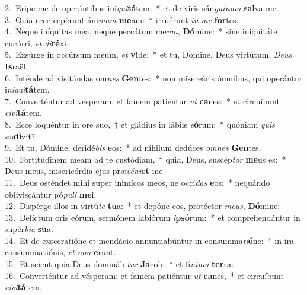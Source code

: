 {2.~}Eripe me de operántibus ini\textit{qui}\textbf{tá}tem:~* et de viris sán\textit{gui}\textit{num} \textbf{sal}va me.\\
{3.~}Quia ecce cepérunt áni\textit{mam} \textbf{me}am:~* irruérunt \textit{in} \textit{me} \textbf{for}tes.\\
{4.~}Neque iníquitas mea, neque peccátum me\textit{um}, \textbf{Dó}mine:~* sine iniquitáte cucúrri, \textit{et} \textit{di}\textbf{ré}xi.\\
{5.~}Exsúrge in occúrsum meum, \textit{et} \textbf{vi}de:~* et tu, Dómine, Deus virtútum, \textit{De}\textit{us} \textbf{Is}raël.\\
{6.~}Inténde ad visitándas om\textit{nes} \textbf{Gen}tes:~* non misereáris ómnibus, qui operántur i\textit{ni}\textit{qui}\textbf{tá}tem.\\
{7.~}Converténtur ad vésperam: et famem patiéntur \textit{ut} \textbf{ca}nes:~* et circuíbunt \textit{ci}\textit{vi}\textbf{tá}tem.\\
{8.~}Ecce loquéntur in ore suo,~† et gládius in lábiis \textit{e}\textbf{ó}rum:~* quóniam \textit{quis} \textit{au}\textbf{dí}vit?\\
{9.~}Et tu, Dómine, deridé\textit{bis} \textbf{e}os:~* ad níhilum dedúces \textit{om}\textit{nes} \textbf{Gen}tes.\\
{10.~}Fortitúdinem meam ad te custódiam,~† quia, Deus, suscép\textit{tor} \textbf{me}us es:~* Deus meus, misericórdia ejus præ\textit{vé}\textit{ni}\textbf{et} me.\\
{11.~}Deus osténdet mihi super inimícos meos, ne occí\textit{das} \textbf{e}os:~* nequándo obliviscántur pó\textit{pu}\textit{li} \textbf{me}i.\\
{12.~}Dispérge illos in virtú\textit{te} \textbf{tu}a:~* et depóne eos, protéctor \textit{me}\textit{us}, \textbf{Dó}mine:\\
{13.~}Delíctum oris eórum, sermónem labiórum \textit{i}\textbf{psó}rum:~* et comprehendántur in supér\textit{bi}\textit{a} \textbf{su}a.\\
{14.~}Et de exsecratióne et mendácio annuntiabúntur in consumma\textit{ti}\textbf{ó}ne:~* in ira consummatiónis, \textit{et} \textit{non} \textbf{e}runt.\\
{15.~}Et scient quia Deus dominábi\textit{tur} \textbf{Ja}cob:~* et fí\textit{ni}\textit{um} \textbf{ter}ræ.\\
{16.~}Converténtur ad vésperam: et famem patiéntur \textit{ut} \textbf{ca}nes,~* et circuíbunt \textit{ci}\textit{vi}\textbf{tá}tem.\\
